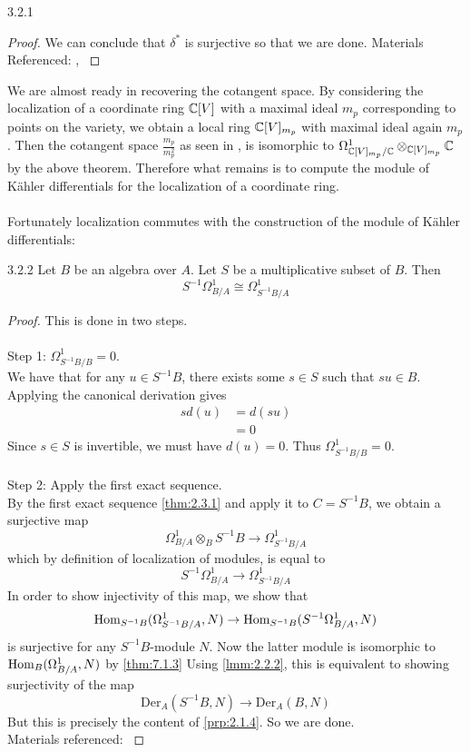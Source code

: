 \documentclass[a4paper]{article}
\begin{document}
\begin{thm}{}{3.2.1}
\begin{proof}
We can conclude that $\delta^\ast$ is surjective so that we are done. 
Materials Referenced: \cite{Har}, \cite{CRing}
\end{proof}
\end{thm}

We are almost ready in recovering the cotangent space. By considering the localization of a coordinate ring $\mathbb{C}[V]$ with a maximal ideal $m_p$ corresponding to points on the variety, we obtain a local ring $\mathbb{C}[V]_{m_p}$ with maximal ideal again $m_p$. Then the cotangent space $\frac{m_p}{m_p^2}$ as seen in \cite{Sha}, is isomorphic to $\Omega_{\mathbb{C}[V]_{m_p}/\mathbb{C}}^1\otimes_{\mathbb{C}[V]_{m_p}} \mathbb{C}$ by the above theorem. Therefore what remains is to compute the module of Kähler differentials for the localization of a coordinate ring. \\~\\

Fortunately localization commutes with the construction of the module of Kähler differentials: 

\begin{prp}{}{3.2.2} Let $B$ be an algebra over $A$. Let $S$ be a multiplicative subset of $B$. Then $$S^{-1}\Omega_{B/A}^1\cong\Omega_{S^{-1}B/A}^1$$ \tcbline
\begin{proof}
This is done in two steps. \\~\\
Step 1: $\Omega_{S^{-1}B/B}^1=0$. \\
We have that for any $u\in S^{-1}B$, there exists some $s\in S$ such that $su\in B$. Applying the canonical derivation gives 
\begin{align*}
sd(u)&=d(su)\tag{$s\in S\subset B$}\\
&=0\tag{$su\in B$}
\end{align*}
Since $s\in S$ is invertible, we must have $d(u)=0$. Thus $\Omega_{S^{-1}B/B}^1=0$. \\~\\

Step 2: Apply the first exact sequence. \\
By the first exact sequence \ref{thm:2.3.1} and apply it to $C=S^{-1}B$, we obtain a surjective map $$\Omega_{B/A}^1\otimes_BS^{-1}B\to\Omega_{S^{-1}B/A}^1$$  which by definition of localization of modules, is equal to $$S^{-1}\Omega_{B/A}^1\to\Omega_{S^{-1}B/A}^1$$ In order to show injectivity of this map, we show that $$\operatorname{Hom}_{S^{-1}B}(\Omega_{S^{-1}B/A}^1,N)\to\operatorname{Hom}_{S^{-1}B}(S^{-1}\Omega_{B/A}^1,N)$$ is surjective for any $S^{-1}B$-module $N$. Now the latter module is isomorphic to $\operatorname{Hom}_B(\Omega_{B/A}^1,N)$ by \ref{thm:7.1.3} Using \ref{lmm:2.2.2}, this is equivalent to showing surjectivity of the map $$\text{Der}_A(S^{-1}B,N)\to\text{Der}_A(B,N)$$ But this is precisely the content of \ref{prp:2.1.4}. So we are done. \\
Materials referenced: \cite{Liu}
\end{proof}
\end{prp}
\end{document}

